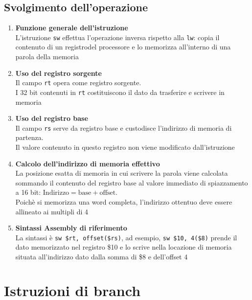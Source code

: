 \subsection{Svolgimento dell'operazione}
\begin{enumerate}
    \item \textbf{Funzione generale dell'istruzione}\\
    L'istruzione \texttt{sw} effettua l'operazione inversa rispetto alla \texttt{lw}: copia il contenuto di un registrodel processore e lo memorizza all'interno di una parola della memoria

    \item \textbf{Uso del registro sorgente}\\
    Il campo \texttt{rt} opera come registro sorgente.\\
    I 32 bit contenuti in \texttt{rt} costituiscono il dato da trasferire e scrivere in memoria

    \item \textbf{Uso del registro base}\\
    Il campo \texttt{rs} serve da registro base e custodisce l'indirizzo di memoria di partenza.\\
    Il valore contenuto in questo registro non viene modificato dall'istruzione

    \item \textbf{Calcolo dell'indirizzo di memoria effettivo}\\
    La posizione esatta di memoria in cui scrivere la parola viene calcolata sommando il contenuto del registro base al valore immediato di spiazzamento a 16 bit: $\text{Indirizzo} = \text{base} + \text{offset}$.\\
    Poichè si memorizza una word completa, l'indirizzo ottentuo deve essere allineato ai multipli di 4

    \item \textbf{Sintassi Assembly di riferimento}\\
    La sintassi è \texttt{sw \$rt, offset(\$rs)}, ad esempio, \texttt{sw \$10, 4(\$8)} prende il dato memorizzato nel registro \$10 e lo scrive nella locazione di memoria situata all'indirizzo dato dalla somma di \$8 e dell'offset 4
\end{enumerate}

\newpage
\section{Istruzioni di branch}
